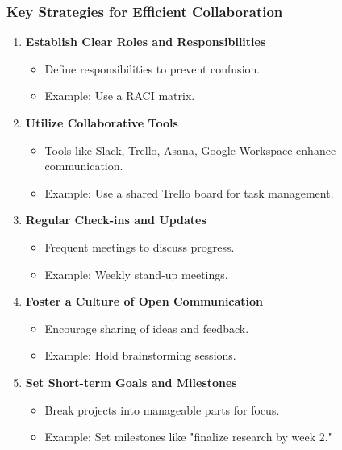 \documentclass[aspectratio=169]{beamer}
\begin{document}
\begin{frame}[fragile]
    \frametitle{Key Strategies for Efficient Collaboration}
    \begin{enumerate}
        \item \textbf{Establish Clear Roles and Responsibilities}
        \begin{itemize}
            \item Define responsibilities to prevent confusion.
            \item Example: Use a RACI matrix.
        \end{itemize}

        \item \textbf{Utilize Collaborative Tools}
        \begin{itemize}
            \item Tools like Slack, Trello, Asana, Google Workspace enhance communication.
            \item Example: Use a shared Trello board for task management.
        \end{itemize}

        \item \textbf{Regular Check-ins and Updates}
        \begin{itemize}
            \item Frequent meetings to discuss progress.
            \item Example: Weekly stand-up meetings.
        \end{itemize}

        \item \textbf{Foster a Culture of Open Communication}
        \begin{itemize}
            \item Encourage sharing of ideas and feedback.
            \item Example: Hold brainstorming sessions.
        \end{itemize}

        \item \textbf{Set Short-term Goals and Milestones}
        \begin{itemize}
            \item Break projects into manageable parts for focus.
            \item Example: Set milestones like "finalize research by week 2."
        \end{itemize}
    \end{enumerate}
\end{frame}
\end{document}

